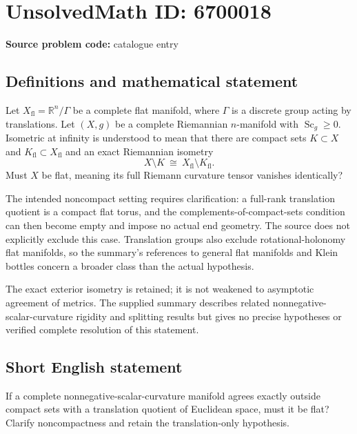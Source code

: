 \documentclass[11pt]{article}
\begin{document}
\section*{UnsolvedMath ID: 6700018}
\textbf{Source problem code:} catalogue entry
\subsection{Definitions and mathematical statement}
Let $X_{\mathrm{fl}}=\mathbb R^n/\Gamma$ be a complete flat manifold, where $\Gamma$ is a discrete group acting by translations. Let $(X,g)$ be a complete Riemannian $n$-manifold with $\operatorname{Sc}_g\geq0$. Isometric at infinity is understood to mean that there are compact sets $K\subset X$ and $K_{\mathrm{fl}}\subset X_{\mathrm{fl}}$ and an exact Riemannian isometry
\[
X\setminus K\ \cong\ X_{\mathrm{fl}}\setminus K_{\mathrm{fl}}.
\]
Must $X$ be flat, meaning its full Riemann curvature tensor vanishes identically?

The intended noncompact setting requires clarification: a full-rank translation quotient is a compact flat torus, and the complements-of-compact-sets condition can then become empty and impose no actual end geometry. The source does not explicitly exclude this case. Translation groups also exclude rotational-holonomy flat manifolds, so the summary's references to general flat manifolds and Klein bottles concern a broader class than the actual hypothesis.

The exact exterior isometry is retained; it is not weakened to asymptotic agreement of metrics. The supplied summary describes related nonnegative-scalar-curvature rigidity and splitting results but gives no precise hypotheses or verified complete resolution of this statement.
\subsection{Short English statement}
If a complete nonnegative-scalar-curvature manifold agrees exactly outside compact sets with a translation quotient of Euclidean space, must it be flat? Clarify noncompactness and retain the translation-only hypothesis.
\end{document}
